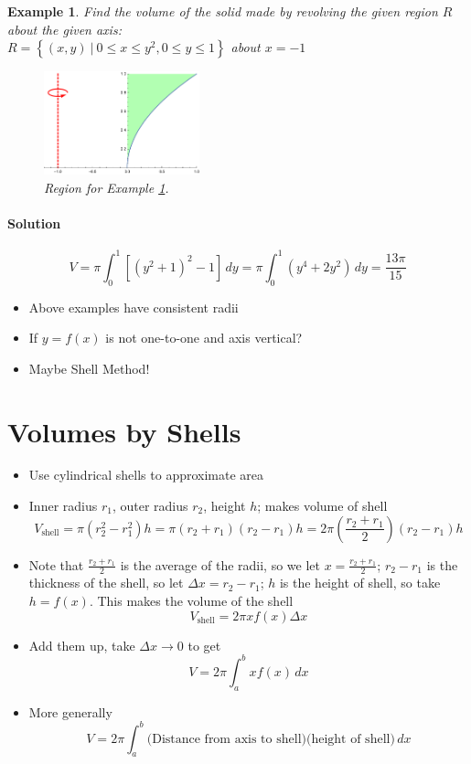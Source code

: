 \documentclass[letterpaper, 11pt, openany]{book}
\theoremstyle{mytheoremstyle}
\theoremstyle{myexamplestyle}
\newtheorem{example}{Example}[section]
\newenvironment{solution}{\paragraph{\sffamily \smaller \fontseries{b}\selectfont Solution}}{\hfill\faSquare}
\begin{document}
\begin{example}
    \label{e:volscsqrtwrty} Find the volume of the solid made by revolving the given region $R$ about the given axis: \\$R = \left\{ (x,y) \ | \ 0 \leq x \leq y^{2}, 0 \leq y \leq 1 \right\}$ about $x = -1$
    
    \begin{figure}[htbp]
        \centering
            \includegraphics[width=0.4\textwidth]{Figures/volscsqrtwrty.pdf}
        \caption{Region for Example \ref{e:volscsqrtwrty}.}
        \label{f:volscsqrtwrty}
    \end{figure}
    
    \begin{solution}
        \[V = \pi \int_{0}^{1} \left[ \left( y^{2} + 1 \right)^{2} - 1 \right]\, dy = \pi \int_{0}^{1} \left( y^{4} + 2y^{2} \right)\, dy = \frac{13\pi}{15}\]
    \end{solution}
\end{example}
    
\begin{itemize}
    \item Above examples have consistent radii
    \item If $y = f(x)$ is not one-to-one and axis vertical? \faFrown
    \item Maybe Shell Method! \faSmile
\end{itemize}

\section{Volumes by Shells}
\setcounter{figure}{0}

\begin{itemize}
    \item Use cylindrical shells to approximate area
    \item Inner radius $r_{1}$, outer radius $r_{2}$, height $h$; makes volume of shell
    \[V_{\text{shell}} = \pi (r_{2}^{2} - r_{1}^{2}) h = \pi (r_{2}+r_{1})(r_{2} - r_{1})h = 2\pi \left( \frac{r_{2} + r_{1}}{2} \right)(r_{2} - r_{1})h  \]
    \item Note that $\frac{r_{2} + r_{1}}{2}$ is the average of the radii, so we let $x = \frac{r_{2} + r_{1}}{2}$; $r_{2} - r_{1}$ is the thickness of the shell, so let $\Delta x = r_{2} - r_{1}$; $h$ is the height of shell, so take $h = f(x)$. This makes the volume of the shell
    \[V_{\text{shell}} = 2 \pi x f(x) \Delta x  \]
    \item Add them up, take $\Delta x \to 0$ to get
    \[V = 2\pi \int_{a}^{b} x f(x) \, dx  \]
    \item More generally
    \[V = 2\pi \int_{a}^{b} \text{(Distance from axis to shell)(height of shell)}\, dx    \]
\end{itemize}
\end{document}
